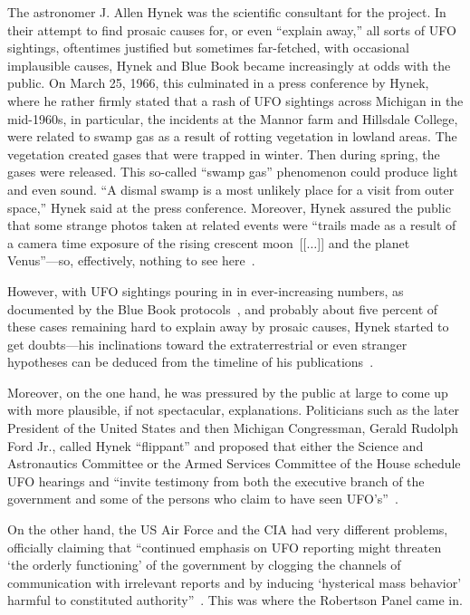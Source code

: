 The astronomer J. Allen Hynek was the scientific consultant for the project.
In their attempt to find prosaic causes for, or even ``explain away,'' all sorts of UFO sightings,
oftentimes justified but sometimes far-fetched, with occasional implausible causes,
Hynek and Blue Book became increasingly at odds with the public. On March 25, 1966,
this culminated in a press conference by Hynek, where he rather firmly stated that a rash of UFO sightings across Michigan in the mid-1960s,
in particular, the incidents at the Mannor farm and Hillsdale College, were related to swamp gas as a result of rotting vegetation in
lowland areas. The vegetation created gases that were trapped in winter. Then during spring, the gases were released.
This so-called ``swamp gas'' phenomenon could produce light and even sound.
``A dismal swamp is a most unlikely place for a visit from outer space,'' Hynek said at the press conference.
Moreover, Hynek assured the public that some strange photos taken at related events were
``trails made as a result of a camera time exposure of the rising crescent moon~[[$\ldots$]] and the planet Venus''---so, effectively, nothing to see here~\cite{Zielin-swampgas}.

However, with UFO sightings pouring in in ever-increasing numbers, as documented by the Blue Book protocols~\cite{bluebook-directory-listing}, and probably about five percent of these cases remaining hard to explain away by prosaic causes, Hynek started to get doubts---his inclinations toward the extraterrestrial or even stranger hypotheses can be deduced from the timeline of his publications~\cite{Hynek:53,Hynek_1969,Hynek1972,Hynek1975Dec,Hynek1977Jan}.


Moreover, on the one hand, he was pressured by the public at large to come up with more plausible, if not spectacular, explanations. Politicians such as the later President of the United States and then Michigan Congressman, Gerald Rudolph Ford Jr., called Hynek ``flippant'' and proposed that either the Science and Astronautics Committee or the Armed Services Committee of the House schedule UFO hearings and ``invite testimony from both the executive branch of the government and some of the persons who claim to have seen UFO's''~\cite{Logan2016Apr}.

On the other hand, the US Air Force and the CIA had very different problems, officially claiming that ``continued emphasis on UFO reporting might threaten `the orderly functioning' of the government by clogging the channels of communication with irrelevant reports and by inducing `hysterical mass behavior' harmful to constituted authority''~\cite{Haines-CIA-UFO}. This was where the Robertson Panel came in.

